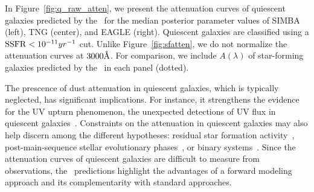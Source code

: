 In Figure~\ref{fig:q_raw_atten}, we present the attenuation curves of
quiescent galaxies predicted by the \eda~for the median posterior parameter
values of SIMBA (left), TNG (center), and EAGLE (right). 
Quiescent galaxies are classified using a ${\rm SSFR} < 10^{-11}{yr}^{-1}$ cut. 
Unlike Figure~\ref{fig:sfatten}, we do not normalize the attenuation curves at
$3000\AA$.  
For comparison, we include $A(\lambda)$ of star-forming galaxies predicted
by the \eda~in each panel (dotted).

The prescence of dust attenuation in quiescent galaxies, which is typically
neglected, has significant implications.  
For instance, it strengthens the evidence for the UV upturn phenomenon, the
unexpected detections of UV flux in quiescent galaxies~\citep[\eg][]{code1969,
oconnell1999, lecras2016, ali2018, dantas2021}. 
Constraints on the attenuation in quiescent galaxies may also help discern
among the different hypotheses: residual star formation
activity~\citep[\eg~][]{kaviraj2007}, post-main-sequence stellar evolutionary
phases~\citep[\eg~][]{yi1997}, or binary systems~\citep[\eg~][]{han2007}.
Since the attenuation curves of quiescent galaxies are difficult to measure
from observations, the \eda~predictions highlight the advantages of a
forward modeling approach and its complementarity with standard approaches. 

